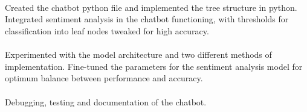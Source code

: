 \documentclass{report}
\begin{document}
     \hspace{-4.8cm}
     \setlength{\headsep}{0pt}
     \setlength{\voffset}{-1.5inch}
     \setlength{\headheight}{0pt}
     \setlength{\topmargin}{0pt}
     \\[+2cm]
     
     \setlength{\baselineskip}{+8mm}
     
     \\[-9mm]
     
     \paragraph{}{\fontsize{15}{18}\selectfont Created the chatbot python file and implemented the tree structure in python. Integrated sentiment analysis in the chatbot functioning, with thresholds for classification into leaf nodes tweaked for high accuracy.}\\[-8mm]
     
     \paragraph{}{\fontsize{15}{18}\selectfont Experimented with the model architecture and two different methods of implementation. Fine-tuned the parameters for the sentiment analysis model for optimum balance between performance and accuracy.}\\[-10mm]
     
     \paragraph{}{\fontsize{15}{18}\selectfont Debugging, testing and documentation of the chatbot.}
     
\end{document}

